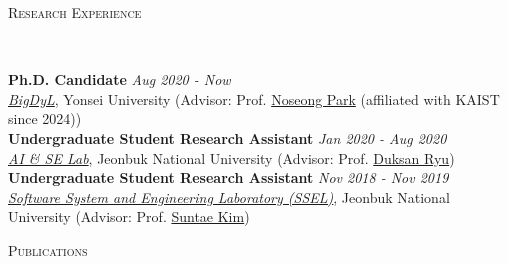 \documentclass[10pt]{article}
\newenvironment{changemargin}[2]{
  \begin{list}{}{
    \setlength{\topsep}{0pt}
    \setlength{\leftmargin}{#1}
    \setlength{\rightmargin}{#2}
    \setlength{\listparindent}{\parindent}
    \setlength{\itemindent}{\parindent}
    \setlength{\parsep}{\parskip}
  }
  \item[]}{\end{list}
}
\newcommand{\lineover}{
	\begin{changemargin}{-0.05in}{-0.05in}
		\vspace*{-8pt}
		\hrulefill \\
		\vspace*{-2pt}
	\end{changemargin}
}
\newcommand{\header}[1]{
	\begin{changemargin}{-0.5in}{-0.5in}
		\scshape{#1}\\
  	\lineover
	\end{changemargin}
}
\newenvironment{body} {
	\vspace*{-16pt}
	\begin{changemargin}{-0.25in}{-0.5in}
  }
	{\end{changemargin}
}
\begin{document}
\medskip
\header{Research Experience}
\begin{body}
	\vspace{14pt}
	\textbf{Ph.D. Candidate} \hfill \emph{Aug 2020 - Now} \\
	\emph{\href{https://sites.google.com/view/npark}{BigDyL}}, Yonsei University (Advisor: Prof. {\href{https://scholar.google.com/citations?user=VSuM3gYAAAAJ&hl=en}{Noseong Park} (affiliated with KAIST since 2024)})  \\
	\textbf{Undergraduate Student Research Assistant} \hfill \emph{Jan 2020 - Aug 2020} \\
	\emph{\href{https://sites.google.com/view/aiselabjbnu}{AI \& SE Lab}}, Jeonbuk National University (Advisor: Prof. {\href{https://scholar.google.com/citations?user=BHue-MMAAAAJ&hl=en}{Duksan Ryu}})  \\
	\textbf{Undergraduate Student Research Assistant} \hfill \emph{Nov 2018 - Nov 2019} \\
	\emph{\href{https://sites.google.com/view/jbnussel/}{Software System and Engineering Laboratory (SSEL)}}, Jeonbuk National University (Advisor: Prof. {\href{https://scholar.google.com/citations?user=IN_HTKEAAAAJ&hl=en}{Suntae Kim}})  \\
\end{body}
\medskip



\header{Publications}
\end{document}
